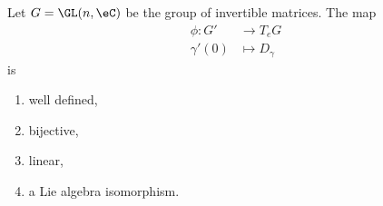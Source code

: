 \begin{theorem}     \label{THOooWQGMooHyjRtx}
	Let \( G=\GL(n,\eC)\) be the group of invertible matrices. The map
	\begin{equation}
		\begin{aligned}
			\phi\colon G' & \to T_eG           \\
			\gamma'(0)    & \mapsto D_{\gamma}
		\end{aligned}
	\end{equation}
	is
	\begin{enumerate}
		\item
		      well defined,
		\item
		      bijective,
		\item
		      linear,
		\item
		      a Lie algebra isomorphism.
	\end{enumerate}
\end{theorem}

